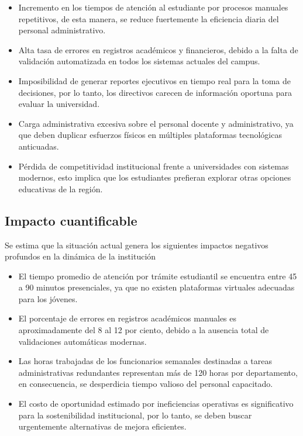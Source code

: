 \documentclass[11pt,spanish]{article}
\begin{document}
\begin{itemize}
    \item Incremento en los tiempos de atención al estudiante por procesos manuales repetitivos, de esta manera, se reduce fuertemente la eficiencia diaria del personal administrativo.
    \item Alta tasa de errores en registros académicos y financieros, debido a la falta de validación automatizada en todos los sistemas actuales del campus.
    \item Imposibilidad de generar reportes ejecutivos en tiempo real para la toma de decisiones, por lo tanto, los directivos carecen de información oportuna para evaluar la universidad.
    \item Carga administrativa excesiva sobre el personal docente y administrativo, ya que deben duplicar esfuerzos físicos en múltiples plataformas tecnológicas anticuadas.
    \item Pérdida de competitividad institucional frente a universidades con sistemas modernos, esto implica que los estudiantes prefieran explorar otras opciones educativas de la región.
\end{itemize}

\subsection{Impacto cuantificable}

Se estima que la situación actual genera los siguientes impactos negativos profundos en la dinámica de la institución

\begin{itemize}
    \item El tiempo promedio de atención por trámite estudiantil se encuentra entre 45 a 90 minutos presenciales, ya que no existen plataformas virtuales adecuadas para los jóvenes.
    \item El porcentaje de errores en registros académicos manuales es aproximadamente del 8 al 12 por ciento, debido a la ausencia total de validaciones automáticas modernas.
    \item Las horas trabajadas de los funcionarios semanales destinadas a tareas administrativas redundantes representan más de 120 horas por departamento, en consecuencia, se desperdicia tiempo valioso del personal capacitado.
    \item El costo de oportunidad estimado por ineficiencias operativas es significativo para la sostenibilidad institucional, por lo tanto, se deben buscar urgentemente alternativas de mejora eficientes.
\end{itemize}
\end{document}
